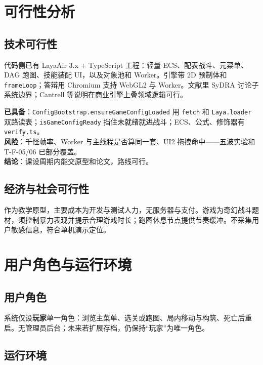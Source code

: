 \documentclass[UTF8,a4paper]{ctexart}
\begin{document}
\section{可行性分析}

\subsection{技术可行性}

代码侧已有 LayaAir 3.x + TypeScript 工程：轻量 ECS、配表战斗、元菜单、DAG 跑图、技能装配 UI，以及对象池和 Worker。引擎带 2D 预制体和 \texttt{frameLoop}；答辩用 Chromium 支持 WebGL2 与 Worker。文献里 SyDRA 讨论子系统边界\cite{ullmann2025sydra}；Cantrell 等说明在商业引擎上叠领域逻辑可行\cite{cantrell2018unity}。

\textbf{已具备}：\texttt{ConfigBootstrap.ensureGameConfigLoaded} 用 \texttt{fetch} 和 \texttt{Laya.loader} 双路读表；\texttt{isGameConfigReady} 挡住未就绪就进战斗；ECS、公式、修饰器有 \texttt{verify.ts}。\\
\textbf{风险}：千怪帧率、Worker 与主线程是否算同一套、UI2 拖拽命中——五波实验和 T-F-05/06 已部分覆盖。\\
\textbf{结论}：课设周期内能交原型和论文，路线可行。

\subsection{经济与社会可行性}

作为教学原型，主要成本为开发与测试人力，无服务器与支付。游戏为奇幻战斗题材，须控制暴力表现并提示合理游戏时长；跑图休息节点提供节奏缓冲。不采集用户敏感信息，符合单机演示定位。

\section{用户角色与运行环境}

\subsection{用户角色}

系统仅设\textbf{玩家}单一角色：浏览主菜单、选关或跑图、局内移动与构筑、死亡后重启。无管理员后台；未来若扩展存档，仍保持“玩家”为唯一角色。

\subsection{运行环境}
\end{document}
